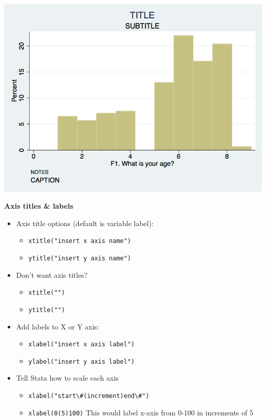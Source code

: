 \documentclass[
]{book}
\providecommand{\tightlist}{%
  \setlength{\itemsep}{0pt}\setlength{\parskip}{0pt}}
\begin{document}
\includegraphics{Stata/StataGraphics/images/hist1.png}

\textbf{Axis titles \& labels}

\begin{itemize}
\tightlist
\item
  Axis title options (default is variable label):

  \begin{itemize}
  \tightlist
  \item
    \texttt{xtitle("insert\ x\ axis\ name")}
  \item
    \texttt{ytitle("insert\ y\ axis\ name")}
  \end{itemize}
\item
  Don't want axis titles?

  \begin{itemize}
  \tightlist
  \item
    \texttt{xtitle("")}
  \item
    \texttt{ytitle("")}
  \end{itemize}
\item
  Add labels to X or Y axis:

  \begin{itemize}
  \tightlist
  \item
    \texttt{xlabel("insert\ x\ axis\ label")}
  \item
    \texttt{ylabel("insert\ y\ axis\ label")}
  \end{itemize}
\item
  Tell Stata how to scale each axis

  \begin{itemize}
  \tightlist
  \item
    \texttt{xlabel("start\textbackslash{}\#(increment)end\textbackslash{}\#")}
  \item
    \texttt{xlabel(0(5)100)} This would label x-axis from 0-100 in increments of 5
  \end{itemize}
\end{itemize}
\end{document}
